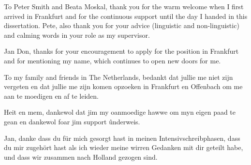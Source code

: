 To Peter Smith and Beata Moskal,
thank you for the warm welcome when I first arrived in Frankfurt and for the continuous support until the day I handed in this dissertation.
Pete, also thank you for your advice (linguistic and non-linguistic) and calming words in your role as my supervisor.

Jan Don, thanks for your encouragement to apply for the position in Frankfurt and for mentioning my name, which continues to open new doors for me.

To my family and friends in The Netherlands, bedankt dat jullie me niet zijn vergeten en dat jullie me zijn komen opzoeken in Frankfurt en Offenbach om me aan te moedigen en af te leiden.

Heit en mem, dankewol dat jim my oanmoedige hawwe om myn eigen paad te gean en dankewol foar jim support ûnderweis.

Jan, danke dass du für mich gesorgt hast in meinen Intensivschreibphasen,
dass du mir zugehört hast als ich wieder meine wirren Gedanken mit dir geteilt habe,
und dass wir zusammen nach Holland gezogen sind.
